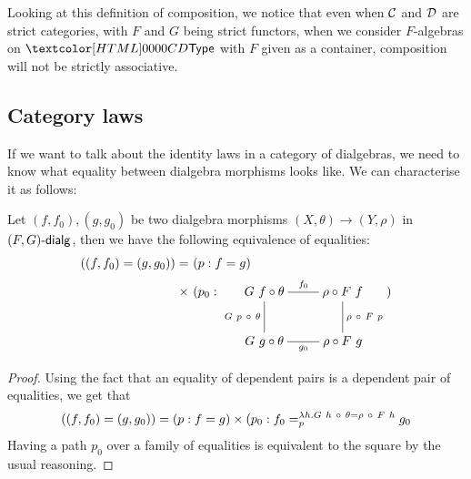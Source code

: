Looking at this definition of composition, we notice that even when
$\mathcal{C}$ and $\mathcal{D}$ are strict categories, with $F$ and $G$ being strict
functors, \eg when we consider $F$-algebras on $\Type$ with $F$ given
as a container, composition will not be strictly associative.

\subsection{Category laws}

If we want to talk about the identity laws in a category of
dialgebras, we need to know what equality between dialgebra morphisms
looks like. We can characterise it as follows:

\begin{proposition}
  \label{morphism-equality}
  Let $(f,f_0),(g,g_0)$ be two dialgebra morphisms
  $(X,\theta) \to (Y,\rho)$ in $\dialgcat{F}{G}$, then we have the
  following equivalence of equalities:
  \begin{align*}
    ((f,f_0) = (g,g_0)) =&\ (p : f = g)\\
    \times&\ (p_0 : 
              \xymatrix{
              G\ f \circ \theta
              \ar@{-}[r]^{f_0}
              \ar@{-}[d]_{G\ p\ \circ\ \theta}
              &\rho \circ F\ f
              \ar@{-}[d]^{\rho\ \circ\ F\ p}
              \\
              G\ g \circ \theta
              \ar@{-}[r]_{g_0}
              &\rho \circ F\ g
              })
  \end{align*}
\end{proposition}

\begin{proof}
  Using the fact that an equality of dependent pairs is a dependent pair of equalities, we get that
  $$
  ((f,f_0) = (g,g_0)) = (p : f = g) \times (p_0 : \pathover{\lambda h . G\ h\ \circ\ \theta = \rho\ \circ\ F\ h}{p}{f_0}{g_0}
  $$
  Having a path $p_0$ over a family of equalities is equivalent to the
  square by the usual reasoning.
\end{proof}

